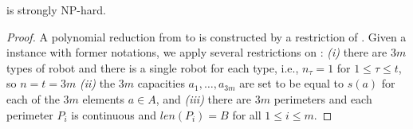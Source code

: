 \begin{theorem}\label{t:opgext-opglr-hard}
	\opglr is strongly NP-hard. 
\end{theorem}
\begin{proof}
	A polynomial reduction from \tpart to \opglrd is constructed
	by a restriction of \opglrd. Given a \tpart instance with former notations,
	we apply several restrictions on \opglrd: {\em (i)} there are $3m$ types of robot
	and there is a single robot 
	for each type, i.e., $n_{\tau} = 1$ for $1 \le \tau \le t$, so $n=t=3m$ 
	{\em (ii)} the $3m$ capacities $a_1, \ldots, a_{3m}$ are set to be equal to
	$s(a)$ for each of the $3m$ elements $a\in A$, and {\em (iii)} 
	there are $3m$ perimeters and each perimeter $P_i$ is continuous and
	$len(P_i)=B$ for all $1 \le i \le m$.

	

	

\end{proof}
